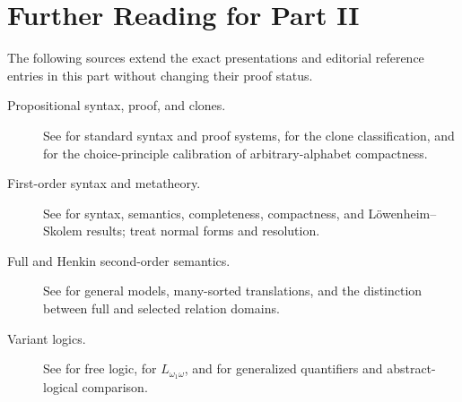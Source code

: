 \chapter*{Further Reading for Part II}
\label{sec:p02-further-reading}

The following sources extend the exact presentations and editorial reference
entries in this part without changing their proof status.

\begin{description}
  \item[Propositional syntax, proof, and clones.]
    See \textcite{Enderton2001,OpenLogic2026} for standard syntax and proof
    systems, \textcite{Post1941} for the clone classification, and
    \textcite{HowardRubin1998} for the choice-principle calibration of
    arbitrary-alphabet compactness.
  \item[First-order syntax and metatheory.]
    See \textcite{ChiswellHodges2007,EbbinghausFlumThomas1994} for syntax,
    semantics, completeness, compactness, and L\"owenheim--Skolem results;
    \textcite{BaazEglyLeitsch2001,Robinson1965} treat normal forms and
    resolution.
  \item[Full and Henkin second-order semantics.]
    See \textcite{Henkin1950,Manzano1996,BarwiseFeferman1985} for general
    models, many-sorted translations, and the distinction between full and
    selected relation domains.
  \item[Variant logics.]
    See \textcite{Lambert1967} for free logic,
    \textcite{Karp1964,Scott1965} for \(L_{\omega_1\omega}\), and
    \textcite{Mostowski1957,Lindstrom1969} for generalized quantifiers and
    abstract-logical comparison.
\end{description}
